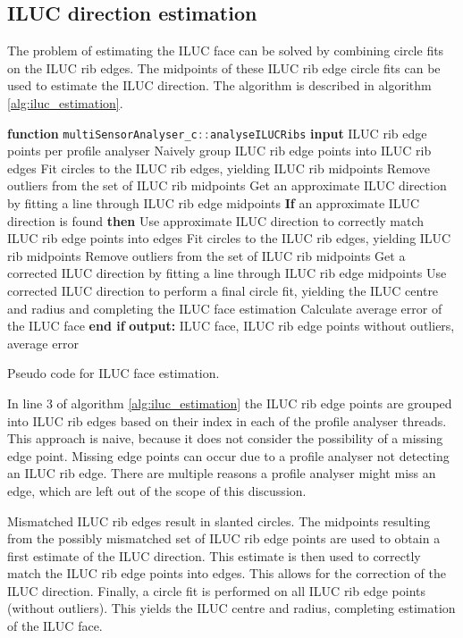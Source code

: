 \subsection{ILUC direction estimation}
The problem of estimating the ILUC face can be solved by combining circle fits on the ILUC rib edges. The midpoints of these ILUC rib edge circle fits can be used to estimate the ILUC direction. The algorithm is described in algorithm \ref{alg:iluc_estimation}.
\begin{algorithm}[H]
    \begin{algorithmic}[1]
        \State \textbf{function} \lstinline[language=C]|multiSensorAnalyser_c::analyseILUCRibs|
        \State \textbf{input} ILUC rib edge points per profile analyser
        \State Naively group ILUC rib edge points into ILUC rib edges
        \State Fit circles to the ILUC rib edges, yielding ILUC rib midpoints
        \State Remove outliers from the set of ILUC rib midpoints
        \State Get an approximate ILUC direction by fitting a line through ILUC rib edge midpoints
        \State \textbf{If} an approximate ILUC direction is found \textbf{then}
        \State \quad Use approximate ILUC direction to correctly match ILUC rib edge points into edges
        \State \quad Fit circles to the ILUC rib edges, yielding ILUC rib midpoints
        \State \quad Remove outliers from the set of ILUC rib midpoints
        \State \quad Get a corrected ILUC direction by fitting a line through ILUC rib edge midpoints
        \State \quad Use corrected ILUC direction to perform a final circle fit, yielding the ILUC centre and radius and completing the ILUC face estimation
        \State \quad Calculate average error of the ILUC face
        \State \textbf{end if}
        \State \textbf{output: } ILUC face, ILUC rib edge points without outliers, average error
    \end{algorithmic}
    \caption{Pseudo code for ILUC face estimation.}
    \label{alg:iluc_estimation}
\end{algorithm}
In line 3 of algorithm \ref{alg:iluc_estimation} the ILUC rib edge points are grouped into ILUC rib edges based on their index in each of the profile analyser threads. This approach is naive, because it does not consider the possibility of a missing edge point. Missing edge points can occur due to a profile analyser not detecting an ILUC rib edge. There are multiple reasons a profile analyser might miss an edge, which are left out of the scope of this discussion.

Mismatched ILUC rib edges result in slanted circles. The midpoints resulting from the possibly mismatched set of ILUC rib edge points are used to obtain a first estimate of the ILUC direction. This estimate is then used to correctly match the ILUC rib edge points into edges. This allows for the correction of the ILUC direction. Finally, a circle fit is performed on all ILUC rib edge points (without outliers). This yields the ILUC centre and radius, completing estimation of the ILUC face.

